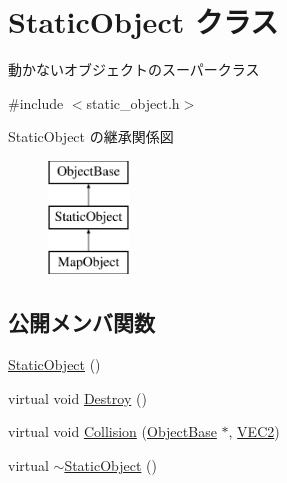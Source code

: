 \hypertarget{class_static_object}{}\section{Static\+Object クラス}
\label{class_static_object}


動かないオブジェクトのスーパークラス  




{\ttfamily \#include $<$static\+\_\+object.\+h$>$}

Static\+Object の継承関係図\begin{figure}[H]
\begin{center}
\leavevmode
\includegraphics[height=3.000000cm]{class_static_object}
\end{center}
\end{figure}
\subsection*{公開メンバ関数}
\begin{DoxyCompactItemize}
\item 
\mbox{\hyperlink{class_static_object_a2a8e918ddfe5c6723b88b9f5c4156472}{Static\+Object}} ()
\item 
virtual void \mbox{\hyperlink{class_static_object_a8e9fb321b4f8f12c4bec1bc66853512f}{Destroy}} ()
\item 
virtual void \mbox{\hyperlink{class_static_object_abe05f711f0d62319e1a11419813c5d50}{Collision}} (\mbox{\hyperlink{class_object_base}{Object\+Base}} $\ast$, \mbox{\hyperlink{transform_8h_afb0c5e21d4133ff4f200992c0b534e1b}{V\+E\+C2}})
\item 
virtual \mbox{\hyperlink{class_static_object_ac27301fc3d8d22aff5664f592c375cd8}{$\sim$\+Static\+Object}} ()
\end{DoxyCompactItemize}
